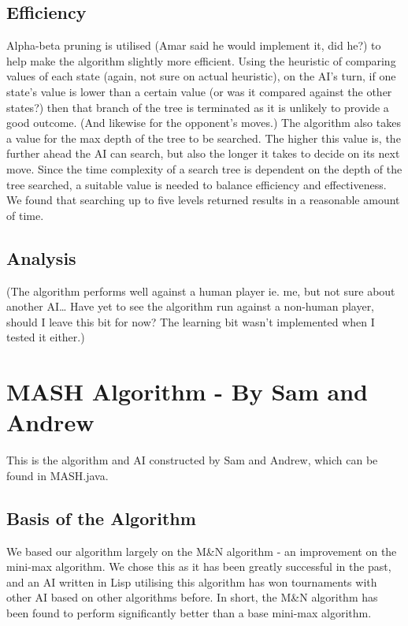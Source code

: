 \documentclass[11pt]{article}
\begin{document}
\subsection{Efficiency}
\label{sec-2-3}

Alpha-beta pruning is utilised (Amar said he would implement it, did he?) to help make the algorithm slightly more efficient. Using the heuristic of comparing values of each state (again, not sure on actual heuristic), on the AI’s turn, if one state’s value is lower than a certain value (or was it compared against the other states?) then that branch of the tree is terminated as it is unlikely to provide a good outcome. (And likewise for the opponent’s moves.)
The algorithm also takes a value for the max depth of the tree to be searched. The higher this value is, the further ahead the AI can search, but also the longer it takes to decide on its next move. Since the time complexity of a search tree is dependent on the depth of the tree searched, a suitable value is needed to balance efficiency and effectiveness. We found that searching up to five levels returned results in a reasonable amount of time.
\subsection{Analysis}
\label{sec-2-4}

(The algorithm performs well against a human player ie. me, but not sure about another AI… Have yet to see the algorithm run against a non-human player, should I leave this bit for now? The learning bit wasn’t implemented when I tested it either.)
\section{MASH Algorithm - By Sam and Andrew}
\label{sec-3}

This is the algorithm and AI constructed by Sam and Andrew, which can be found in MASH.java.

\subsection{Basis of the Algorithm}
\label{sec-3-1}

We based our algorithm largely on the M\&N algorithm - an improvement on the mini-max algorithm. We chose this as it has been greatly successful in the past, and an AI written in Lisp utilising this algorithm has won tournaments with other AI based on other algorithms before. In short, the M\&N algorithm has been found to perform significantly better than a base mini-max algorithm.
\end{document}
